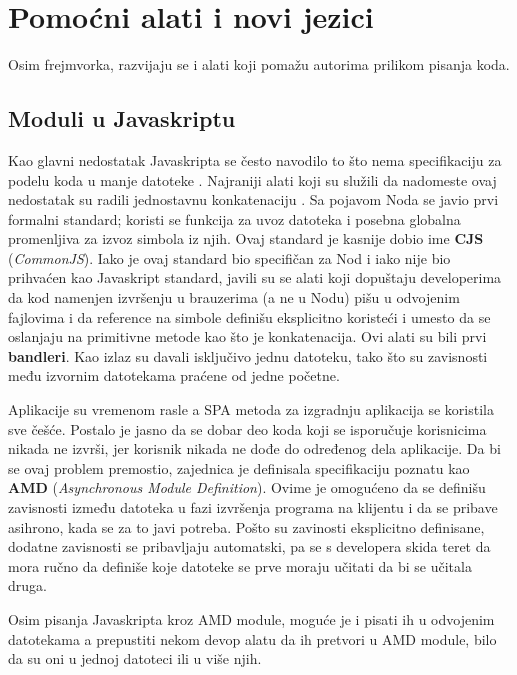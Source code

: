 \section{Pomoćni alati i novi jezici}

Osim frejmvorka, razvijaju se i alati koji pomažu autorima prilikom pisanja koda.

\subsection{Moduli u Javaskriptu}
\label{subsec:js-moduli}

Kao glavni nedostatak Javaskripta se često navodilo to što nema specifikaciju za podelu koda u manje datoteke \cite[\S10]{eloquent-js}.
Najraniji alati koji su služili da nadomeste ovaj nedostatak su radili jednostavnu konkatenaciju \cite{ancienct-concat}.
Sa pojavom Noda se javio prvi formalni standard; koristi se funkcija  za uvoz datoteka i posebna globalna promenljiva  za izvoz simbola iz njih.
Ovaj standard je kasnije dobio ime \textbf{CJS} (\textsl{CommonJS}).
Iako je ovaj standard bio specifičan za Nod i iako nije bio prihvaćen kao Javaskript standard, javili su se alati koji dopuštaju developerima da kod namenjen izvršenju u brauzerima (a ne u Nodu) pišu u odvojenim fajlovima i da reference na simbole definišu eksplicitno koristeći  i  umesto da se oslanjaju na primitivne metode kao što je konkatenacija.
Ovi alati su bili prvi \textbf{bandleri}.
Kao izlaz su davali isključivo jednu  datoteku, tako što su zavisnosti među izvornim datotekama praćene od jedne početne.

Aplikacije su vremenom rasle a SPA metoda za izgradnju aplikacija se koristila sve češće.
Postalo je jasno da se dobar deo koda koji se isporučuje korisnicima nikada ne izvrši, jer korisnik nikada ne dođe do određenog dela aplikacije.
Da bi se ovaj problem premostio, zajednica je definisala specifikaciju poznatu kao \textbf{AMD} (\textsl{Asynchronous Module Definition}).
Ovime je omogućeno da se definišu zavisnosti između datoteka u fazi izvršenja programa na klijentu i da se pribave asihrono, kada se za to javi potreba.
Pošto su zavinosti eksplicitno definisane, dodatne zavisnosti se pribavljaju automatski, pa se s developera skida teret da mora ručno da definiše koje datoteke se prve moraju učitati da bi se učitala druga.

Osim pisanja Javaskripta kroz AMD module, moguće je i pisati ih u odvojenim datotekama a prepustiti nekom devop alatu da ih pretvori u AMD module, bilo da su oni u jednoj datoteci ili u više njih.

